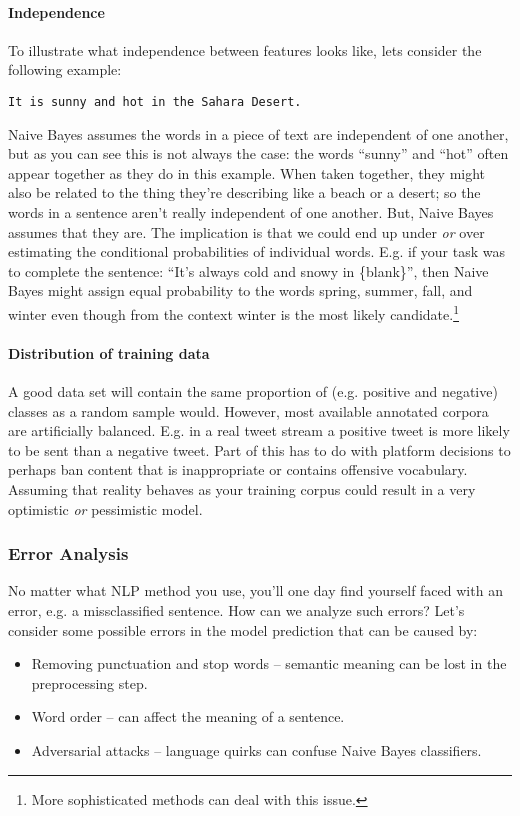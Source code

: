 \documentclass[12pt]{article}
\begin{document}
\paragraph{Independence} To illustrate what independence between features looks like, lets consider the following example:
\begin{verbatim}
It is sunny and hot in the Sahara Desert.
\end{verbatim}
Naive Bayes assumes the words in a piece of text are independent of one another, but as you can see this is not always the case: the words ``sunny'' and ``hot'' often appear together as they do in this example. When taken together, they might also be related to the thing they're describing like a beach or a desert; so the words in a sentence aren't really independent of one another. But, Naive Bayes assumes that they are. The implication is that we could end up under \emph{or} over estimating the conditional probabilities of individual words. E.g. if your task was to complete the sentence: ``It's always cold and snowy in \{blank\}'', then Naive Bayes might assign equal probability to the words spring, summer, fall, and winter even though from the context winter is the most likely candidate.\footnote{More sophisticated methods can deal with this issue.}

\paragraph{Distribution of training data} A good data set will contain the same proportion of (e.g. positive and negative) classes as a random sample would. However, most available annotated corpora are artificially balanced. E.g. in a real tweet stream a positive tweet is more likely to be sent than a negative tweet. Part of this has to do with platform decisions to perhaps ban content that is inappropriate or contains offensive vocabulary. Assuming that reality behaves as your training corpus could result in a very optimistic \emph{or} pessimistic model.

\subsubsection{Error Analysis} No matter what NLP method you use, you'll one day find yourself faced with an error, e.g. a missclassified sentence. How can we analyze such errors? Let's consider some possible errors in the model prediction that can be caused by:
\begin{itemize}
\item Removing punctuation and stop words -- semantic meaning can be lost in the preprocessing step.
\item Word order -- can affect the meaning of a sentence.
\item Adversarial attacks -- language quirks can confuse Naive Bayes classifiers.
\end{itemize}
\end{document}
